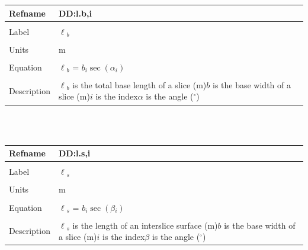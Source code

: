\documentclass[12pt]{article}
\begin{document}
\noindent \begin{minipage}{\textwidth}
\begin{tabular}{p{} p{}}
\toprule \textbf{Refname} & \textbf{DD:l.b,i}
\label{DD:l.b,i}
\\ \midrule \\
Label & $\ell{}_{b}$
\\ \midrule \\
Units & m
\\ \midrule \\
Equation & $\ell{}_{b}$ = $b_{i}\sec\left(\alpha{}_{i}\right)$
\\ \midrule \\
Description & $\ell{}_{b}$ is the total base length of a slice (m)\newline$b$ is the base width of a slice (m)\newline$i$ is the index\newline$\alpha{}$ is the angle (${}^{\circ}$)
\\ \bottomrule \end{tabular}
\end{minipage}\\
~\newline
\noindent \begin{minipage}{\textwidth}
\begin{tabular}{p{} p{}}
\toprule \textbf{Refname} & \textbf{DD:l.s,i}
\label{DD:l.s,i}
\\ \midrule \\
Label & $\ell{}_{s}$
\\ \midrule \\
Units & m
\\ \midrule \\
Equation & $\ell{}_{s}$ = $b_{i}\sec\left(\beta{}_{i}\right)$
\\ \midrule \\
Description & $\ell{}_{s}$ is the length of an interslice surface (m)\newline$b$ is the base width of a slice (m)\newline$i$ is the index\newline$\beta{}$ is the angle (${}^{\circ}$)
\\ \bottomrule \end{tabular}
\end{minipage}\\
~\newline
\end{document}
